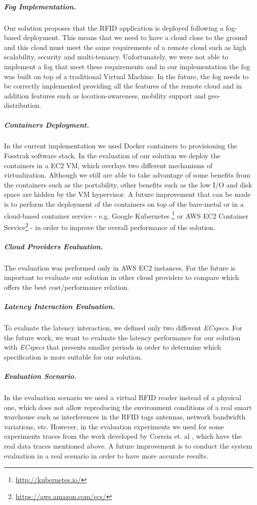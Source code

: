 \subparagraph{Fog Implementation.}
\label{subp:fog_impl}
Our solution proposes that the \gls{RFID} application is deployed following a fog-based deployment.
This means that we need to have a cloud close to the ground and this cloud must meet the same
requirements of a remote cloud such as high scalability, security and multi-tenancy. Unfortunately,
we were not able to implement a fog that meet these requirements and in our implementation the fog
was built on top of a traditional Virtual Machine. In the future, the fog needs to be correctly
implemented providing all the features of the remote cloud and in addition features such as
location-awareness, mobility support and geo-distribution.

\subparagraph{Containers Deployment.}
\label{subp:containers_impl}
In the current implementation we used Docker containers to provisioning the Fosstrak software stack.
In the evaluation of our solution we deploy the containers in a \gls{EC2} \gls{VM}, which overlays two
different mechanisms of virtualization. Although we still are able to take advantage of some benefits
from the containers such as the portability, other benefits such as the low I/O and disk space are
hidden by the \gls{VM} hypervisor. A future improvement that can be made is to perform the deployment
of the containers on top of the bare-metal or in a cloud-based container service - e.g. Google Kubernetes
\footnote{\url{http://kubernetes.io/}} or \gls{AWS} \gls{EC2} Container Service\footnote{\url{https://aws.amazon.com/ecs/}} -
in order to improve the overall performance of the solution.

\subparagraph{Cloud Providers Evaluation.}
\label{subp:cloud_eval}
The evaluation was performed only in \gls{AWS} \gls{EC2} instances. For the future is important to
evaluate our solution in other cloud providers to compare which offers the best cost/performance
relation.

\subparagraph{Latency Interaction Evaluation.}
\label{subp:latency_eval}
To evaluate the latency interaction, we defined only two different \textit{ECspecs}. For the future work,
we want to evaluate the latency performance for our solution with \textit{ECspecs} that presents smaller
periods in order to determine which specification is more suitable for our solution.

\subparagraph{Evaluation Scenario.}
\label{subp:scenario_eval}
In the evaluation scenario we used a virtual \gls{RFID} reader instead of a physical one, which does
not allow reproducing the environment conditions of a real smart warehouse such as interferences in
the \gls{RFID} tags antennas, network bandwidth variations, etc. However, in the evaluation experiments
we used for some experiments traces from the work developed by Correia et. al \cite{Correia:Thesis:2014},
which have the real data traces mentioned above. A future improvement is to conduct the system
evaluation in a real scenario in order to have more accurate results.

